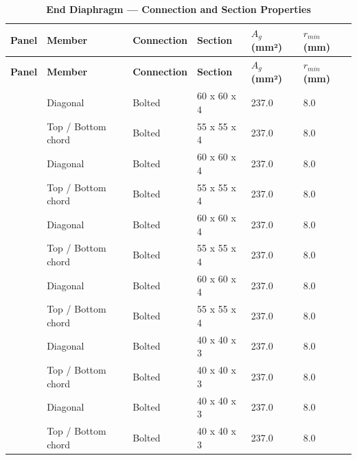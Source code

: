 \documentclass[12pt,a4paper]{report}
\numberwithin{table}{chapter}
\numberwithin{figure}{chapter}
\newcommand{\ReportTableRowGap}{6pt}
\begin{document}
\begin{longtable}{|C{2.0cm}|L{2.0cm}|L{2.2cm}|C{2.5cm}|C{2.0cm}|C{2.0cm}|}
\caption{\textbf{End Diaphragm --- Connection and Section Properties}}\\
\hline
\textbf{Panel} & \textbf{Member} & \textbf{Connection} & \textbf{Section} & \textbf{$A_g$ (mm²)} & \textbf{$r_{min}$ (mm)} \\[\ReportTableRowGap]
\hline
\endfirsthead
\hline
\textbf{Panel} & \textbf{Member} & \textbf{Connection} & \textbf{Section} & \textbf{$A_g$ (mm²)} & \textbf{$r_{min}$ (mm)} \\[\ReportTableRowGap]
\hline
\endhead

 & Diagonal & Bolted & 60 x 60 x 4 & 237.0 & 8.0 \\[\ReportTableRowGap]
 & Top / Bottom chord & Bolted & 55 x 55 x 4 & 237.0 & 8.0 \\[\ReportTableRowGap]
\hline
{} & Diagonal & Bolted & 60 x 60 x 4 & 237.0 & 8.0 \\[\ReportTableRowGap]
 & Top / Bottom chord & Bolted & 55 x 55 x 4 & 237.0 & 8.0 \\[\ReportTableRowGap]
\hline
{} & Diagonal & Bolted & 60 x 60 x 4 & 237.0 & 8.0 \\[\ReportTableRowGap]
 & Top / Bottom chord & Bolted & 55 x 55 x 4 & 237.0 & 8.0 \\[\ReportTableRowGap]
\hline
{} & Diagonal & Bolted & 60 x 60 x 4 & 237.0 & 8.0 \\[\ReportTableRowGap]
 & Top / Bottom chord & Bolted & 55 x 55 x 4 & 237.0 & 8.0 \\[\ReportTableRowGap]
\hline
{} & Diagonal & Bolted & 40 x 40 x 3 & 237.0 & 8.0 \\[\ReportTableRowGap]
 & Top / Bottom chord & Bolted & 40 x 40 x 3 & 237.0 & 8.0 \\[\ReportTableRowGap]
\hline
{} & Diagonal & Bolted & 40 x 40 x 3 & 237.0 & 8.0 \\[\ReportTableRowGap]
 & Top / Bottom chord & Bolted & 40 x 40 x 3 & 237.0 & 8.0 \\[\ReportTableRowGap]

\end{longtable}
\end{document}

